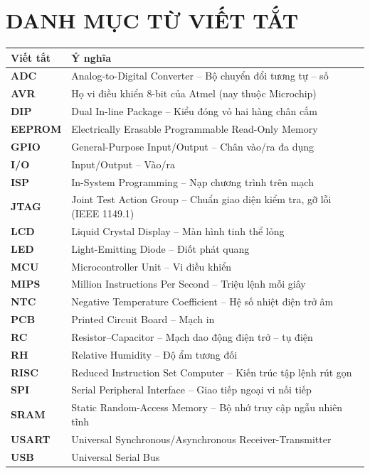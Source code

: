 \chapter*{DANH MỤC TỪ VIẾT TẮT}

\begin{center}
\renewcommand{\arraystretch}{1.15}
\begin{tabularx}{\textwidth}{>{\bfseries}p{2.4cm} X}
\toprule
Viết tắt & Ý nghĩa \\
\midrule
ADC & Analog-to-Digital Converter -- Bộ chuyển đổi tương tự -- số \\
AVR & Họ vi điều khiển 8-bit của Atmel (nay thuộc Microchip) \\
DIP & Dual In-line Package -- Kiểu đóng vỏ hai hàng chân cắm \\
EEPROM & Electrically Erasable Programmable Read-Only Memory \\
GPIO & General-Purpose Input/Output -- Chân vào/ra đa dụng \\
I/O & Input/Output -- Vào/ra \\
ISP & In-System Programming -- Nạp chương trình trên mạch \\
JTAG & Joint Test Action Group -- Chuẩn giao diện kiểm tra, gỡ lỗi (IEEE 1149.1) \\
LCD & Liquid Crystal Display -- Màn hình tinh thể lỏng \\
LED & Light-Emitting Diode -- Điốt phát quang \\
MCU & Microcontroller Unit -- Vi điều khiển \\
MIPS & Million Instructions Per Second -- Triệu lệnh mỗi giây \\
NTC & Negative Temperature Coefficient -- Hệ số nhiệt điện trở âm \\
PCB & Printed Circuit Board -- Mạch in \\
RC & Resistor--Capacitor -- Mạch dao động điện trở -- tụ điện \\
RH & Relative Humidity -- Độ ẩm tương đối \\
RISC & Reduced Instruction Set Computer -- Kiến trúc tập lệnh rút gọn \\
SPI & Serial Peripheral Interface -- Giao tiếp ngoại vi nối tiếp \\
SRAM & Static Random-Access Memory -- Bộ nhớ truy cập ngẫu nhiên tĩnh \\
USART & Universal Synchronous/Asynchronous Receiver-Transmitter \\
USB & Universal Serial Bus \\
\bottomrule
\end{tabularx}
\end{center}

